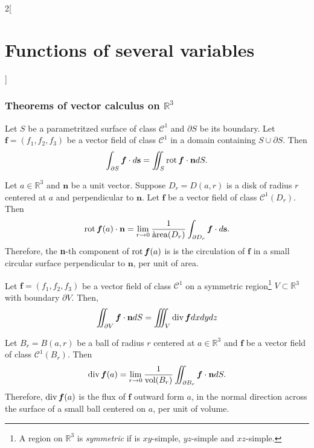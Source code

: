 \documentclass[class=article,10pt,crop=false]{standalone}
\begin{document}
\begin{multicols}{2}[\section{Functions of several variables}]
\subsubsection{Theorems of vector calculus on \texorpdfstring{$\mathbb{R}^3$}{R3}}
\begin{theorem}
Let $S$ be a parametritzed surface of class $\mathcal{C}^1$ and $\partial S$ be its boundary. Let $\boldsymbol{f}=(f_1,f_2,f_3)$ be a vector field of class $\mathcal{C}^1$ in a domain containing $S\cup\partial S$. Then $$\int_{\partial S}\boldsymbol{f}\cdot d\textbf{s}=\iint_S\text{rot}\,\boldsymbol{f}\cdot\textbf{n} dS.$$
\end{theorem}
\begin{corollary}
Let $a\in\mathbb{R}^3$ and $\textbf{n}$ be a unit vector. Suppose $D_r=D(a,r)$ is a disk of radius $r$ centered at $a$ and perpendicular to $\textbf{n}$. Let $\boldsymbol{f}$ be a vector field of class $\mathcal{C}^1(D_r)$. Then $$\text{rot}\,\boldsymbol{f}(a)\cdot\textbf{n}=\lim_{r\to 0}\frac{1}{\text{àrea}(D_r)}\int_{\partial D_r}\boldsymbol{f}\cdot d\textbf{s}.$$ Therefore, the \textbf{n}-th component of $\text{rot}\,\boldsymbol{f}(a)$ is is the circulation of $\boldsymbol{f}$ in a small circular surface perpendicular to $\textbf{n}$, per unit of area.
\end{corollary}
\begin{theorem}
Let $\boldsymbol{f}=(f_1,f_2,f_3)$ be a vector field of class $\mathcal{C}^1$ on a symmetric region\footnote{A region on $\mathbb{R}^3$ is \textit{symmetric} if is $xy$-simple, $yz$-simple and $xz$-simple.} $V\subset\mathbb{R}^3$ with boundary $\partial V$. Then, $$\iint_{\partial V}\boldsymbol{f}\cdot\textbf{n} dS=\iiint_V\text{div}\,\boldsymbol{f}dxdydz$$
\end{theorem}
\begin{corollary}
Let $B_r=B(a,r)$ be a ball of radius $r$ centered at $a\in\mathbb{R}^3$ and $\boldsymbol{f}$ be a vector field of class $\mathcal{C}^1(B_r)$. Then $$\text{div}\,\boldsymbol{f}(a)=\lim_{r\to 0}\frac{1}{\text{vol}(B_r)}\iint_{\partial B_r}\boldsymbol{f}\cdot\textbf{n} dS.$$ Therefore, $\text{div}\,\boldsymbol{f}(a)$ is the flux of $\boldsymbol{f}$ outward form $a$, in the normal direction across the surface of a small ball centered on $a$, per unit of volume.
\end{corollary}
\end{multicols}
\end{document}
